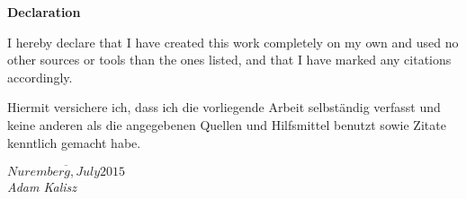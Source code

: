 \thispagestyle{plain}
\begin{center}
	
	\LARGE
	\textbf{Declaration}
	
\end{center}
\vspace{100pt}
I hereby declare that I have created this work completely on my own and used no other sources or tools than the ones listed, and that I have marked any citations accordingly.

Hiermit versichere ich, dass ich die vorliegende Arbeit selbst\"andig verfasst und keine anderen als die angegebenen Quellen und Hilfsmittel benutzt sowie Zitate kenntlich gemacht habe. 

\begin{flushright}
\vspace{12mm}
$\overline{Nuremberg, July \mathit{ 2015}}$\\
\textit{Adam Kalisz}
\end{flushright}
